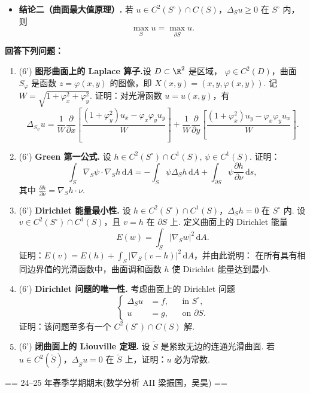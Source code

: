 \begin{enumerate}
\begin{itemize}
\item[$\bullet$] \textbf{结论二（曲面最大值原理）.} 若
$\displaystyle u\in C^2(S^\circ)\cap C(S)$，$\Delta_Su\ge0$ 在 $S^\circ$ 内，则
\[
\max_Su=\max_{\partial S}u.
\]
\end{itemize}
\textbf{回答下列问题：}
\begin{enumerate}
\item[(a)] (6') \textbf{图形曲面上的 Laplace 算子.}\quad 设 \(D\subset\R^2\) 是区域，
\(\varphi\in C^2(D)\)，曲面 \(S_\varphi\) 是函数 \(z=\varphi(x,y)\) 的图像，即
$\displaystyle X(x,y)=(x,y,\varphi(x,y))$. 记 $\displaystyle W=\sqrt{1+\varphi_x^2+\varphi_y^2}$. 
证明：对光滑函数 \(u=u(x,y)\)，有
\[
\Delta_{S_\varphi}u=\frac1W\frac{\partial}{\partial x}
\left[\frac{(1+\varphi_y^2)u_x-\varphi_x\varphi_yu_y}{W}\right]
+\frac1W\frac{\partial}{\partial y}
\left[\frac{(1+\varphi_x^2)u_y-\varphi_x\varphi_yu_x}{W}\right].
\]
\item[(b)] (6') \textbf{Green 第一公式.} \quad 设 $h\in C^2(S^\circ)\cap C^1(S),\, \psi\in C^1(S)$.
证明：
\[
\int_S\nabla_S\psi\cdot\nabla_Sh\,\mathrm{d}A
=-\int_S\psi\Delta_Sh\,\mathrm{d}A+\int_{\partial S}\psi\frac{\partial h}{\partial\nu}\,\mathrm{d} s,
\]
其中 $\displaystyle\frac{\partial h}{\partial\nu}=\nabla_Sh\cdot\nu$.
\item[(c)](6') \textbf{Dirichlet 能量最小性.} \quad 设 $h\in C^2(S^\circ)\cap C^1(S)$，$\Delta_Sh=0$ 在 $S^\circ$ 内.
设 \(v\in C^2(S^\circ)\cap C^1(S)\)，且 \(v=h\) 在 \(\partial S\) 上. 定义曲面上的 Dirichlet 能量
\[
E(w)=\int_S|\nabla_Sw|^2\,\mathrm{d}A.
\]
证明：$\displaystyle E(v)=E(h)+\int_S|\nabla_S(v-h)|^2\,\mathrm{d}A$，并由此说明：
在所有具有相同边界值的光滑函数中，曲面调和函数 \(h\) 使 Dirichlet 能量达到最小.
\item[(d)](6') \textbf{Dirichlet 问题的唯一性.} \quad 考虑曲面上的 Dirichlet 问题
\[
\left\{
\begin{aligned}
\Delta_Su&=f, &&\text{in }S^\circ,\\
u&=g, &&\text{on }\partial S.
\end{aligned}
\right.
\]
证明：该问题至多有一个 \(C^2(S^\circ)\cap C(S)\) 解.
\item[(e)](6') \textbf{闭曲面上的 Liouville 定理.} \quad 设 \(\widetilde S\) 是紧致无边的连通光滑曲面. 若 
$u\in C^2(\widetilde S)$，$\Delta_{\widetilde S}u=0$ 在 $\widetilde S$ 上，证明：\(u\) 必为常数.
\end{enumerate}
\end{enumerate}

== 24--25 年春季学期期末(数学分析 AII 梁振国，吴昊) ==

